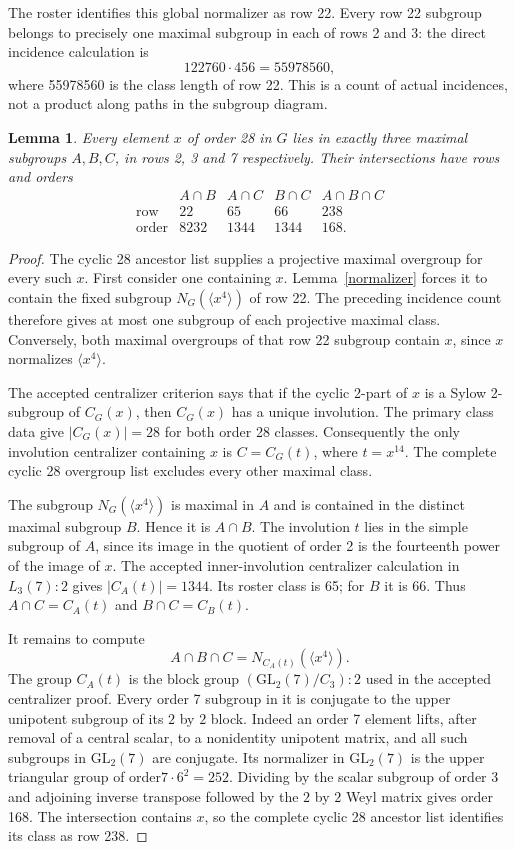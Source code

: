 \documentclass[11pt,a4paper]{article}
\newtheorem{lemma}{Lemma}\newtheorem{theorem}{Theorem}
\begin{document}
The roster identifies this global normalizer as row 22. Every row 22
subgroup belongs to precisely one maximal subgroup in each of rows 2
and 3: the direct incidence calculation is
\[
                       122760\cdot456=55978560,
\]
where 55978560 is the class length of row 22. This is a count of actual
incidences, not a product along paths in the subgroup diagram.

\begin{lemma}\label{three}
Every element $x$ of order 28 in $G$ lies in exactly three maximal
subgroups $A,B,C$, in rows 2, 3 and 7 respectively. Their intersections
have rows and orders
\[
\begin{array}{c|rrrr}
 &A\cap B&A\cap C&B\cap C&A\cap B\cap C\\\hline
\text{row}&22&65&66&238\\
\text{order}&8232&1344&1344&168.
\end{array}
\]
\end{lemma}
\begin{proof}
The cyclic 28 ancestor list supplies a projective maximal overgroup
for every such $x$. First consider one containing $x$.
Lemma~\ref{normalizer} forces it to contain the fixed subgroup
$N_G(\langle x^4\rangle)$ of row 22. The preceding incidence count
therefore gives at most one subgroup of each projective maximal class.
Conversely, both maximal overgroups of that row 22 subgroup contain
$x$, since $x$ normalizes $\langle x^4\rangle$.

The accepted centralizer criterion says that if the cyclic 2-part of
$x$ is a Sylow 2-subgroup of $C_G(x)$, then $C_G(x)$ has a unique
involution. The primary class data give $|C_G(x)|=28$ for both
order 28 classes. Consequently the only involution centralizer
containing $x$ is $C=C_G(t)$, where $t=x^{14}$. The complete
cyclic 28 overgroup list excludes every other maximal class.

The subgroup $N_G(\langle x^4\rangle)$ is maximal in $A$ and is
contained in the distinct maximal subgroup $B$. Hence it is $A\cap B$.
The involution $t$ lies in the simple subgroup of $A$, since its image
in the quotient of order 2 is the fourteenth power of the image of $x$.
The accepted inner-involution centralizer calculation in $L_3(7):2$
gives $|C_A(t)|=1344$. Its roster class is 65; for $B$ it is 66.
Thus $A\cap C=C_A(t)$ and $B\cap C=C_B(t)$.

It remains to compute
\[
 A\cap B\cap C=N_{C_A(t)}(\langle x^4\rangle).
\]
The group $C_A(t)$ is the block group
$(\mathrm{GL}_2(7)/C_3):2$ used in the accepted centralizer proof.
Every order 7 subgroup in it is conjugate to the upper unipotent
subgroup of its $2$ by $2$ block. Indeed an order 7 element lifts,
after removal of a central scalar, to a nonidentity unipotent matrix,
and all such subgroups in $\mathrm{GL}_2(7)$ are conjugate.
Its normalizer in $\mathrm{GL}_2(7)$ is the upper triangular group
of order$7\cdot6^2=252$. Dividing by the scalar subgroup of order 3
and adjoining inverse transpose followed by the $2$ by $2$ Weyl
matrix gives order 168. The intersection contains $x$, so the complete
cyclic 28 ancestor list identifies its class as row 238.
\end{proof}
\end{document}
